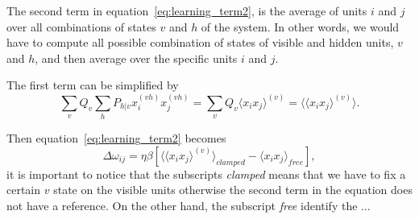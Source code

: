 The second term in equation~\ref{eq:learning_term2}, is the average of units $i$ and $j$ over all combinations of states $v$ and $h$ of the system. 
In other words, we would have to compute all possible combination of states of visible and hidden units, $v$ and $h$, and then average over the specific units $i$ and $j$. 

The first term can be simplified by
\begin{equation}
  \sum_{v} Q_{v} \sum_{h} P_{h|v} x^{(vh)}_{i} x^{(vh)}_{j} = \sum_{v} Q_{v} \langle x_{i} x_{j} \rangle^{(v)} = \langle \langle x_{i} x_{j} \rangle^{(v)} \rangle.
  \label{eq:clamped_term}
\end{equation}

Then equation~\ref{eq:learning_term2} becomes
\begin{equation}
  \Delta \omega_{ij} = \eta \beta \left[ \langle \langle x_{i} x_{j} \rangle^{(v)} \rangle_{clamped} - \langle x_{i} x_{j} \rangle_{free} \right],
  \label{eq:learning_term3}
\end{equation}
it is important to notice that the subscripts \textit{clamped} means that we have to fix a certain $v$ state on the visible units otherwise the second term in the equation does not have a reference. 
On the other hand, the subscript \textit{free} identify the $\ldots$
